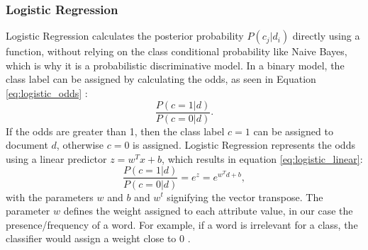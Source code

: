 \subsubsection{Logistic Regression}

Logistic Regression calculates the posterior probability $P(c_j|d_i)$ directly using a function, without relying on the class conditional probability like Naive Bayes, which is why it is a probabilistic discriminative model. In a binary model, the class label can be assigned by calculating the odds, as seen in Equation \eqref{eq:logistic_odds} \cite{DBLP:books/aw/TanSKK2019}:
        \begin{equation}
            \label{eq:logistic_odds}
                \frac{P(c=1|d)}{P(c=0|d)}.
        \end{equation}
If the odds are greater than 1, then the class label $c=1$ can be assigned to document $d$, otherwise $c=0$ is assigned. Logistic Regression represents the odds using a linear predictor $z=w^Tx + b$, which results in equation \eqref{eq:logistic_linear}:
        \begin{equation}
            \label{eq:logistic_linear}
                \frac{P(c=1|d)}{P(c=0|d)} = e^z = e^{w^Td+b},
        \end{equation}
with the parameters $w$ and $b$ and $w^t$ signifying the vector transpose. The parameter $w$ defines the weight assigned to each attribute value, in our case the presence/frequency of a word. For example, if a word is irrelevant for a class, the classifier would assign a weight close to 0 \cite{DBLP:books/aw/TanSKK2019}. 

